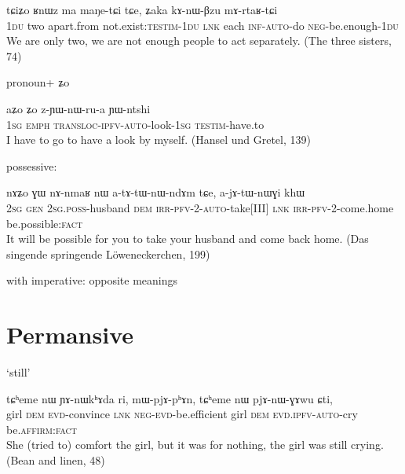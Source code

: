 \documentclass[oldfontcommands,oneside,a4paper,11pt]{article}
\newcommand{\ipa}[1]{{\phon \mbox{#1}}} %
\begin{document}
   \begin{exe}
\ex \label{ex:kAnWBzu.mArtaRtCi}
\gll
\ipa{tɕiʑo} 	\ipa{ʁnɯz} 	\ipa{ma} 	\ipa{maŋe-tɕi} 	\ipa{tɕe,} 	\ipa{ʑaka} 	\ipa{kɤ-nɯ-βzu} 	\ipa{mɤ-rtaʁ-tɕi} \\
\textsc{1du} two apart.from not.exist:\textsc{testim}-\textsc{1du} \textsc{lnk} each \textsc{inf-auto}-do \textsc{neg}-be.enough-\textsc{1du} \\
\glt We are only two, we are not enough people to act separately. (The three sisters, 74)
\end{exe} 

pronoun+ \ipa{ʑo}

\begin{exe}
\ex \label{ex:zYWnWrua}
\gll
\ipa{aʑo} 	\ipa{ʑo} 	\ipa{z-ɲɯ-nɯ-ru-a} 	\ipa{ɲɯ-ntshi} \\
\textsc{1sg} \textsc{emph} \textsc{transloc-ipfv-auto}-look-\textsc{1sg} \textsc{testim}-have.to \\
\glt I have to go to have a look by myself. (Hansel und Gretel, 139)
\end{exe} 

possessive:
\begin{exe}
\ex \label{ex:atAtWnWndAm}
\gll
\ipa{nɤʑo} 	\ipa{ɣɯ} 	\ipa{nɤ-nmaʁ} 	\ipa{nɯ} 	\ipa{a-tɤ-tɯ-nɯ-ndɤm} 	\ipa{tɕe,} 	\ipa{a-jɤ-tɯ-nɯɣi} 	\ipa{khɯ}   \\
\textsc{2sg} \textsc{gen} \textsc{2sg.poss}-husband \textsc{dem} \textsc{irr-pfv-2-auto}-take[III]  \textsc{lnk} \textsc{irr-pfv-2}-come.home  be.possible:\textsc{fact} \\
\glt It will be possible for you to take your husband and come back home. (Das singende springende Löweneckerchen, 199)
\end{exe} 



with imperative: opposite meanings

\section{Permansive}
`still'
\begin{exe}
\ex \label{ex:pjAnWGAwu}
\gll
\ipa{tɕʰeme} 	\ipa{nɯ} 	\ipa{ɲɤ-nɯkʰɤda} 	\ipa{ri,} 	\ipa{mɯ-pjɤ-pʰɤn,} 	\ipa{tɕʰeme} 	\ipa{nɯ} 	\ipa{pjɤ-nɯ-ɣɤwu} 	\ipa{ɕti,} \\
girl \textsc{dem} \textsc{evd}-convince \textsc{lnk} \textsc{neg-evd}-be.efficient girl \textsc{dem} \textsc{evd.ipfv-auto}-cry  be.\textsc{affirm:fact} \\
\glt She (tried to) comfort the girl, but it was for nothing, the girl was still crying. (Bean and linen, 48)
\end{exe} 
\end{document}
